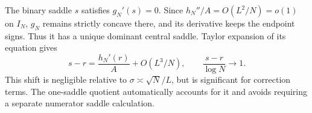 The binary saddle $s$ satisfies $g_N'(s)=0$. Since $h_N''/A=O(L^2/N)=o(1)$ on $I_N$, $g_N$ remains strictly concave there, and its derivative keeps the endpoint signs. Thus it has a unique dominant central saddle. Taylor expansion of its equation gives
\begin{equation}\label{pdt:eq:binaryshift}
 s-r=\frac{h_N'(r)}A+O(L^3/N),\qquad \frac{s-r}{\log N}\longrightarrow1.
\end{equation}
This shift is negligible relative to $\sigma\asymp\sqrt N/L$, but is significant for correction terms. The one-saddle quotient automatically accounts for it and avoids requiring a separate numerator saddle calculation.
